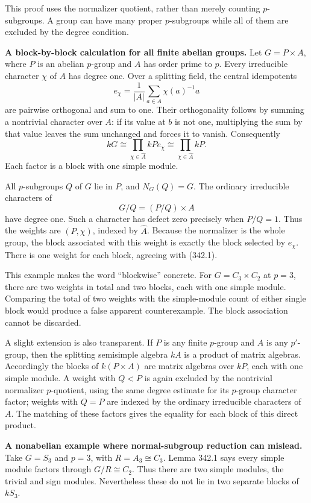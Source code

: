 \documentclass[11pt]{article}
\begin{document}
This proof uses the normalizer quotient, rather than merely counting $p$-subgroups. A group can have many proper $p$-subgroups while all of them are excluded by the degree condition.

\textbf{A block-by-block calculation for all finite abelian groups.} Let $G=P\times A$, where $P$ is an abelian $p$-group and $A$ has order prime to $p$. Every irreducible character $\chi$ of $A$ has degree one. Over a splitting field, the central idempotents
\[
 e_\chi=\frac1{|A|}\sum_{a\in A}\chi(a)^{-1}a
\]
are pairwise orthogonal and sum to one. Their orthogonality follows by summing a nontrivial character over $A$: if its value at $b$ is not one, multiplying the sum by that value leaves the sum unchanged and forces it to vanish. Consequently
\[
 kG\cong\prod_{\chi\in\widehat A}kP e_\chi
      \cong\prod_{\chi\in\widehat A}kP.
 \tag{342.1}
\]
Each factor is a block with one simple module.

All $p$-subgroups $Q$ of $G$ lie in $P$, and $N_G(Q)=G$. The ordinary irreducible characters of
\[
 G/Q=(P/Q)\times A
\]
have degree one. Such a character has defect zero precisely when $P/Q=1$. Thus the weights are $(P,\chi)$, indexed by $\widehat A$. Because the normalizer is the whole group, the block associated with this weight is exactly the block selected by $e_\chi$. There is one weight for each block, agreeing with (342.1).

This example makes the word ``blockwise'' concrete. For $G=C_3\times C_2$ at $p=3$, there are two weights in total and two blocks, each with one simple module. Comparing the total of two weights with the simple-module count of either single block would produce a false apparent counterexample. The block association cannot be discarded.

A slight extension is also transparent. If $P$ is any finite $p$-group and $A$ is any $p'$-group, then the splitting semisimple algebra $kA$ is a product of matrix algebras. Accordingly the blocks of $k(P\times A)$ are matrix algebras over $kP$, each with one simple module. A weight with $Q<P$ is again excluded by the nontrivial normalizer $p$-quotient, using the same degree estimate for its $p$-group character factor; weights with $Q=P$ are indexed by the ordinary irreducible characters of $A$. The matching of these factors gives the equality for each block of this direct product.

\textbf{A nonabelian example where normal-subgroup reduction can mislead.} Take $G=S_3$ and $p=3$, with $R=A_3\cong C_3$. Lemma 342.1 says every simple module factors through $G/R\cong C_2$. Thus there are two simple modules, the trivial and sign modules. Nevertheless these do not lie in two separate blocks of $kS_3$.
\end{document}
